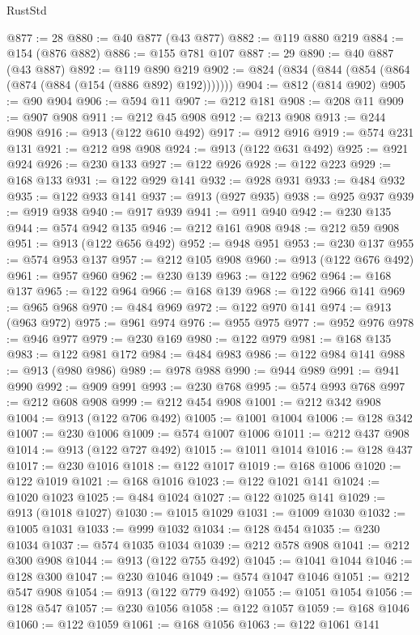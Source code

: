 \begin{lexlean}{RustStd}
\begin{coremodule}
@877 := 28
@880 := @40 @877 (@43 @877)
@882 := @119 @880 @219
@884 := @154 (@876 @882)
@886 := @155 @781 @107
@887 := 29
@890 := @40 @887 (@43 @887)
@892 := @119 @890 @219
@902 := @824 (@834 (@844 (@854 (@864 (@874 (@884 (@154 (@886 @892) @192)))))))
@904 := @812 (@814 @902)
@905 := @90 @904
@906 := @594 @11
@907 := @212 @181
@908 := @208 @11
@909 := @907 @908
@911 := @212 @45 @908
@912 := @213 @908
@913 := @244 @908
@916 := @913 (@122 @610 @492)
@917 := @912 @916
@919 := @574 @231 @131
@921 := @212 @98 @908
@924 := @913 (@122 @631 @492)
@925 := @921 @924
@926 := @230 @133
@927 := @122 @926
@928 := @122 @223
@929 := @168 @133
@931 := @122 @929 @141
@932 := @928 @931
@933 := @484 @932
@935 := @122 @933 @141
@937 := @913 (@927 @935)
@938 := @925 @937
@939 := @919 @938
@940 := @917 @939
@941 := @911 @940
@942 := @230 @135
@944 := @574 @942 @135
@946 := @212 @161 @908
@948 := @212 @59 @908
@951 := @913 (@122 @656 @492)
@952 := @948 @951
@953 := @230 @137
@955 := @574 @953 @137
@957 := @212 @105 @908
@960 := @913 (@122 @676 @492)
@961 := @957 @960
@962 := @230 @139
@963 := @122 @962
@964 := @168 @137
@965 := @122 @964
@966 := @168 @139
@968 := @122 @966 @141
@969 := @965 @968
@970 := @484 @969
@972 := @122 @970 @141
@974 := @913 (@963 @972)
@975 := @961 @974
@976 := @955 @975
@977 := @952 @976
@978 := @946 @977
@979 := @230 @169
@980 := @122 @979
@981 := @168 @135
@983 := @122 @981 @172
@984 := @484 @983
@986 := @122 @984 @141
@988 := @913 (@980 @986)
@989 := @978 @988
@990 := @944 @989
@991 := @941 @990
@992 := @909 @991
@993 := @230 @768
@995 := @574 @993 @768
@997 := @212 @608 @908
@999 := @212 @454 @908
@1001 := @212 @342 @908
@1004 := @913 (@122 @706 @492)
@1005 := @1001 @1004
@1006 := @128 @342
@1007 := @230 @1006
@1009 := @574 @1007 @1006
@1011 := @212 @437 @908
@1014 := @913 (@122 @727 @492)
@1015 := @1011 @1014
@1016 := @128 @437
@1017 := @230 @1016
@1018 := @122 @1017
@1019 := @168 @1006
@1020 := @122 @1019
@1021 := @168 @1016
@1023 := @122 @1021 @141
@1024 := @1020 @1023
@1025 := @484 @1024
@1027 := @122 @1025 @141
@1029 := @913 (@1018 @1027)
@1030 := @1015 @1029
@1031 := @1009 @1030
@1032 := @1005 @1031
@1033 := @999 @1032
@1034 := @128 @454
@1035 := @230 @1034
@1037 := @574 @1035 @1034
@1039 := @212 @578 @908
@1041 := @212 @300 @908
@1044 := @913 (@122 @755 @492)
@1045 := @1041 @1044
@1046 := @128 @300
@1047 := @230 @1046
@1049 := @574 @1047 @1046
@1051 := @212 @547 @908
@1054 := @913 (@122 @779 @492)
@1055 := @1051 @1054
@1056 := @128 @547
@1057 := @230 @1056
@1058 := @122 @1057
@1059 := @168 @1046
@1060 := @122 @1059
@1061 := @168 @1056
@1063 := @122 @1061 @141

\end{coremodule}
\end{lexlean}
